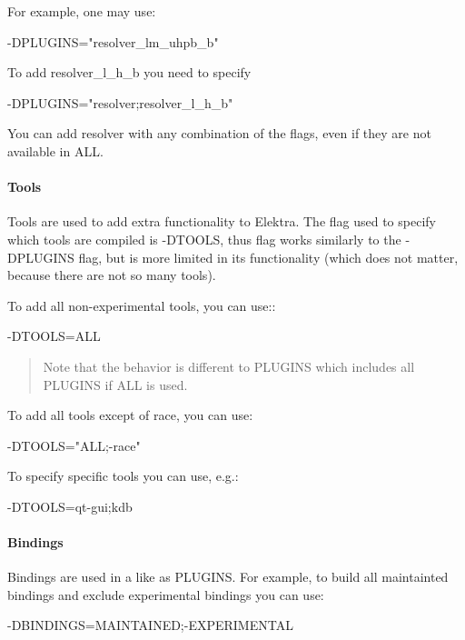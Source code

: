For example, one may use\+: \begin{DoxyVerb}-DPLUGINS="resolver_lm_uhpb_b"
\end{DoxyVerb}


To add {\ttfamily resolver\+\_\+l\+\_\+h\+\_\+b} you need to specify \begin{DoxyVerb}-DPLUGINS="resolver;resolver_l_h_b"
\end{DoxyVerb}


You can add resolver with any combination of the flags, even if they are not available in {\ttfamily A\+LL}.

\paragraph*{Tools}

Tools are used to add extra functionality to Elektra. The flag used to specify which tools are compiled is {\ttfamily -\/\+D\+T\+O\+O\+LS}, thus flag works similarly to the {\ttfamily -\/\+D\+P\+L\+U\+G\+I\+NS} flag, but is more limited in its functionality (which does not matter, because there are not so many tools).

To add all non-\/experimental tools, you can use\+:\+: \begin{DoxyVerb}-DTOOLS=ALL
\end{DoxyVerb}


\begin{quote}
Note that the behavior is different to P\+L\+U\+G\+I\+NS which includes all P\+L\+U\+G\+I\+NS if A\+LL is used. \end{quote}


To add all tools except of race, you can use\+: \begin{DoxyVerb}-DTOOLS="ALL;-race"
\end{DoxyVerb}


To specify specific tools you can use, e.\+g.\+: \begin{DoxyVerb}-DTOOLS=qt-gui;kdb
\end{DoxyVerb}


\paragraph*{Bindings}

Bindings are used in a like as {\ttfamily P\+L\+U\+G\+I\+NS}. For example, to build all maintainted bindings and exclude experimental bindings you can use\+: \begin{DoxyVerb}-DBINDINGS=MAINTAINED;-EXPERIMENTAL
\end{DoxyVerb}


